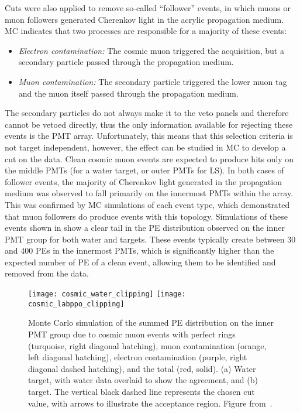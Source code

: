 Cuts were also applied to remove so-called ``follower'' events, in which muons or muon followers generated Cherenkov light in the acrylic propagation medium.
MC indicates that two processes are responsible for a majority of these events: 
\begin{itemize}
\item \emph{Electron contamination:} The cosmic muon triggered the acquisition, but a secondary particle passed through the propagation medium.
\item \emph{Muon contamination:} The secondary particle triggered the lower muon tag and the muon itself passed through the propagation medium.  
\end{itemize}
The secondary particles do not always make it to the veto panels and therefore cannot be vetoed directly, thus the only information available for rejecting these events is the PMT array.  
Unfortunately, this means that this selection criteria is not target independent, however, the effect can be studied in MC to develop a cut on the data.
Clean cosmic muon events are expected to produce hits only on the middle PMTs (for a water target, or outer PMTs for LS).
In both cases of follower events, the majority of Cherenkov light generated in the propagation medium was observed to fall primarily on the innermost PMTs within the array.  
This was confirmed by MC simulations of each event type, which demonstrated that muon followers do produce events with this topology.   
Simulations of these events shown in  show a clear tail in the PE distribution observed on the inner PMT group for both water and {\labppo} targets.
These events typically create between 30 and 400 PEs in the innermost PMTs, which is significantly higher than the expected number of PE of a clean event, allowing them to be identified and removed from the data.

\begin{figure}
\centering
\texttt{[image: cosmic\_water\_clipping]}
\texttt{[image: cosmic\_labppo\_clipping]}
\caption{ Monte Carlo simulation of the summed PE distribution on the inner PMT group due to cosmic muon events with perfect rings (turquoise, right diagonal hatching), muon contamination (orange, left diagonal hatching), electron contamination (purple, right diagonal dashed hatching), and the total (red, solid).  (a) Water target, with water data overlaid to show the agreement, and (b) {\labppo} target.  The vertical black dashed line represents the chosen cut value, with arrows to illustrate the acceptance region. Figure from~\cite{chess_nim}.}
\label{f:clipMC}
\end{figure}

